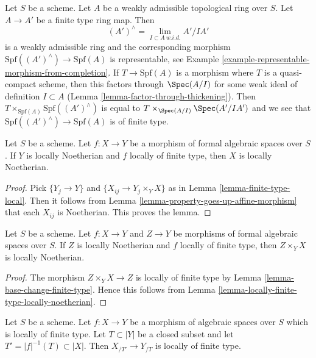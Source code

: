 \begin{example}
\label{example-finite-type-from-finite-type-ring-map}
Let $S$ be a scheme. Let $A$ be a weakly admissible topological ring over $S$.
Let $A \to A'$ be a finite type ring map. Then
$$
(A')^\wedge = \lim_{I \subset A\ w.i.d.} A'/IA'
$$
is a weakly admissible ring and the corresponding morphism
$\text{Spf}((A')^\wedge) \to \text{Spf}(A)$ is representable,
see Example \ref{example-representable-morphism-from-completion}.
If $T \to \text{Spf}(A)$ is a morphism where $T$ is a quasi-compact
scheme, then this factors through $\Spec(A/I)$ for some weak
ideal of definition $I \subset A$ (Lemma \ref{lemma-factor-through-thickening}).
Then $T \times_{\text{Spf}(A)} \text{Spf}((A')^\wedge)$
is equal to $T \times_{\Spec(A/I)} \Spec(A'/IA')$ and
we see that $\text{Spf}((A')^\wedge) \to \text{Spf}(A)$ is
of finite type.
\end{example}

\begin{lemma}
\label{lemma-locally-finite-type-locally-noetherian}
Let $S$ be a scheme. Let $f : X \to Y$ be a morphism of
formal algebraic spaces over $S$. If $Y$ is locally Noetherian and
$f$ locally of finite type, then $X$ is locally Noetherian.
\end{lemma}

\begin{proof}
Pick $\{Y_j \to Y\}$ and $\{X_{ij} \to Y_j \times_Y X\}$
as in Lemma \ref{lemma-finite-type-local}. Then it follows
from Lemma \ref{lemma-property-goes-up-affine-morphism}
that each $X_{ij}$ is Noetherian. This proves the lemma.
\end{proof}

\begin{lemma}
\label{lemma-fibre-product-Noetherian}
Let $S$ be a scheme. Let $f : X \to Y$ and $Z \to Y$ be morphisms
of formal algebraic spaces over $S$. If $Z$ is locally
Noetherian and $f$ locally of finite type, then
$Z \times_Y X$ is locally Noetherian.
\end{lemma}

\begin{proof}
The morphism $Z \times_Y X \to Z$ is locally of finite type by
Lemma \ref{lemma-base-change-finite-type}. Hence this follows
from Lemma \ref{lemma-locally-finite-type-locally-noetherian}.
\end{proof}

\begin{lemma}
\label{lemma-map-completions-finite-type}
Let $S$ be a scheme. Let $f : X \to Y$ be a morphism
of algebraic spaces over $S$ which is locally of finite type.
Let $T \subset |Y|$ be a closed subset and let $T' = |f|^{-1}(T) \subset |X|$.
Then $X_{/T'} \to Y_{/T}$ is locally of finite type.
\end{lemma}

